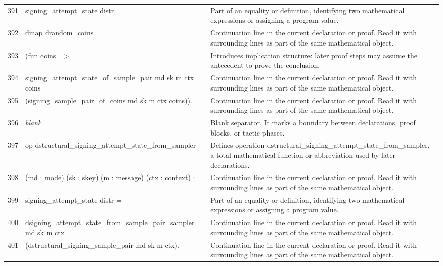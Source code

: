 \documentclass[10pt]{article}
\begin{document}
\begin{longtable}{r L{0.53\textwidth} L{0.37\textwidth}}
391 & {\ttfamily\scriptsize    signing\_attempt\_state distr =} & Part of an equality or definition, identifying two mathematical expressions or assigning a program value. \\
392 & {\ttfamily\scriptsize   dmap drandom\_coins} & Continuation line in the current declaration or proof.  Read it with surrounding lines as part of the same mathematical object. \\
393 & {\ttfamily\scriptsize     (fun coins =>} & Introduces implication structure: later proof steps may assume the antecedent to prove the conclusion. \\
394 & {\ttfamily\scriptsize       signing\_attempt\_state\_of\_sample\_pair md sk m ctx coins} & Continuation line in the current declaration or proof.  Read it with surrounding lines as part of the same mathematical object. \\
395 & {\ttfamily\scriptsize         (signing\_sample\_pair\_of\_coins md sk m ctx coins)).} & Continuation line in the current declaration or proof.  Read it with surrounding lines as part of the same mathematical object. \\
396 & {\ttfamily\scriptsize \emph{blank}} & Blank separator.  It marks a boundary between declarations, proof blocks, or tactic phases. \\
397 & {\ttfamily\scriptsize op dstructural\_signing\_attempt\_state\_from\_sampler} & Defines operation dstructural\_signing\_attempt\_state\_from\_sampler, a total mathematical function or abbreviation used by later declarations. \\
398 & {\ttfamily\scriptsize    (md : mode) (sk : skey) (m : message) (ctx : context) :} & Continuation line in the current declaration or proof.  Read it with surrounding lines as part of the same mathematical object. \\
399 & {\ttfamily\scriptsize    signing\_attempt\_state distr =} & Part of an equality or definition, identifying two mathematical expressions or assigning a program value. \\
400 & {\ttfamily\scriptsize   dsigning\_attempt\_state\_from\_sample\_pair\_sampler md sk m ctx} & Continuation line in the current declaration or proof.  Read it with surrounding lines as part of the same mathematical object. \\
401 & {\ttfamily\scriptsize     (dstructural\_signing\_sample\_pair md sk m ctx).} & Continuation line in the current declaration or proof.  Read it with surrounding lines as part of the same mathematical object. \\

\end{longtable}
\end{document}
